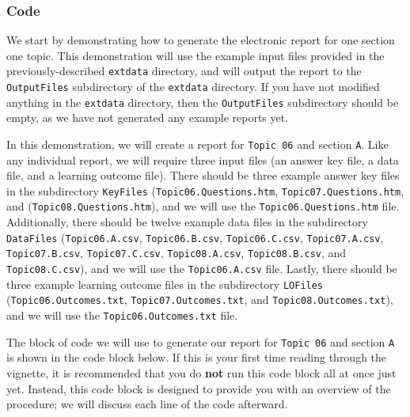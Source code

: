 \documentclass{article}\usepackage[]{graphicx}\usepackage[]{color}
\numberwithin{equation}{section} %
\begin{document}
\subsubsection{Code}
\label{sec:codeOnce}

We start by demonstrating how to generate the electronic report for one section one topic. This demonstration will use the example input files provided in the previously-described \texttt{extdata} directory, and will output the report to the \texttt{OutputFiles} subdirectory of the \texttt{extdata} directory. If you have not modified anything in the \texttt{extdata} directory, then the \texttt{OutputFiles} subdirectory should be empty, as we have not generated any example reports yet. 

In this demonstration, we will create a report for \texttt{Topic 06} and section \texttt{A}. Like any individual report, we will require three input files (an answer key file, a data file, and a learning outcome file). There should be three example answer key files in the subdirectory \texttt{KeyFiles} (\texttt{Topic06.Questions.htm}, \texttt{Topic07.Questions.htm}, and (\texttt{Topic08.Questions.htm}), and we will use the \texttt{Topic06.Questions.htm} file. Additionally, there should be twelve example data files in the subdirectory \texttt{DataFiles} (\texttt{Topic06.A.csv}, \texttt{Topic06.B.csv}, \texttt{Topic06.C.csv}, \texttt{Topic07.A.csv}, \texttt{Topic07.B.csv}, \texttt{Topic07.C.csv}, \texttt{Topic08.A.csv}, \texttt{Topic08.B.csv}, and \texttt{Topic08.C.csv}), and we will use the \texttt{Topic06.A.csv} file. Lastly, there should be three example learning outcome files in the subdirectory \texttt{LOFiles} (\texttt{Topic06.Outcomes.txt}, \texttt{Topic07.Outcomes.txt}, and \texttt{Topic08.Outcomes.txt}), and we will use the \texttt{Topic06.Outcomes.txt} file.

The block of code we will use to generate our report for \texttt{Topic 06} and section \texttt{A} is shown in the code block below. If this is your first time reading through the vignette, it is recommended that you do \textbf{not} run this code block all at once just yet. Instead, this code block is designed to provide you with an overview of the procedure; we will discuss each line of the code afterward. \\
\end{document}
